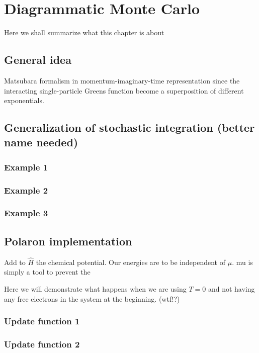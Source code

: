 \documentclass[12pt]{report}
\newcommand{\todo}[1]{{\leavevmode\color{todo}#1}}
\begin{document}
\chapter{Diagrammatic Monte Carlo}

\todo{Here we shall summarize what this chapter is about}

\section{General idea}

\todo{Matsubara formalism in momentum-imaginary-time representation since the interacting single-particle Greens function become a superposition of different exponentials.}

\section{Generalization of stochastic integration (better name needed)}

\subsection{Example 1}
\subsection{Example 2}
\subsection{Example 3}

\section{Polaron implementation}


\todo{Add to $ \hat H $ the chemical potential. Our energies are to be independent of $ \mu $. mu is simply a tool to prevent the}

\todo{Here we will demonstrate what happens when we are using $ T = 0 $ and not having any free electrons in the system at the beginning. (wtf!?)}

\subsection{Update function 1}
\subsection{Update function 2}
\end{document}
